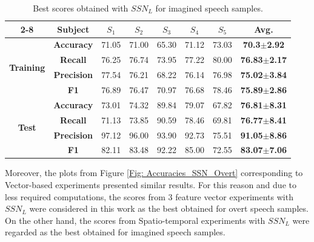 \begin{table}[h!]
\centering
\caption{Best scores obtained with $SSN_{L}$ for imagined speech samples.}
\begin{tabular}{|*{8}{c|}}
	\cline{2-8}
	\multicolumn{1}{c|}{\multirow{1}{*}} & \textbf{Subject} & \boldmath$S_{1}$ & \boldmath$S_{2}$ & \boldmath$S_{3}$ & \boldmath$S_{4}$ & \boldmath$S_{5}$ & \textbf{Avg.} \\\hline
	\multirow{4}{*}{\begin{sideways}\textbf{Training}\end{sideways}} & \textbf{Accuracy} & 71.05 & 71.00 & 65.30 & 71.12 & 73.03 & \textbf{70.3}\boldmath$\pm$\textbf{2.92} \\\cline{2-8}
	& \textbf{Recall} & 76.25 & 76.74 & 73.95 & 77.22 & 80.00 & \textbf{76.83}\boldmath$\pm$\textbf{2.17} \\\cline{2-8}
	& \textbf{Precision} & 77.54 & 76.21 & 68.22 & 76.14 & 76.98 & \textbf{75.02}\boldmath$\pm$\textbf{3.84} \\\cline{2-8}
	& \textbf{F1} & 76.89 & 76.47 & 70.97 & 76.68 & 78.46 & \textbf{75.89}\boldmath$\pm$\textbf{2.86} \\\hline
	\multirow{4}{*}{\begin{sideways}\textbf{Test}\end{sideways}} & \textbf{Accuracy} & 73.01 & 74.32 & 89.84 & 79.07 & 67.82 & \textbf{76.81}\boldmath$\pm$\textbf{8.31} \\\cline{2-8}
	& \textbf{Recall} & 71.13 & 73.85 & 90.59 & 78.46 & 69.81 & \textbf{76.77}\boldmath$\pm$\textbf{8.41} \\\cline{2-8}
	& \textbf{Precision} & 97.12 & 96.00 & 93.90 & 92.73 & 75.51 & \textbf{91.05}\boldmath$\pm$\textbf{8.86} \\\cline{2-8}
	& \textbf{F1} & 82.11 & 83.48 & 92.22 & 85.00 & 72.55 & \textbf{83.07}\boldmath$\pm$\textbf{7.06} \\\hline
\end{tabular}%
\label{Table: Imagined_Scores}%
\end{table}%

Moreover, the plots from Figure \ref{Fig: Accuracies_SSN_Overt} corresponding to Vector-based experiments presented similar results. For this reason and due to less required computations, the scores from 3 feature vector experiments with $SSN_{L}$ were considered in this work as the best obtained for overt speech samples. On the other hand, the scores from Spatio-temporal experiments with $SSN_{L}$ were regarded as the best obtained for imagined speech samples.\\

